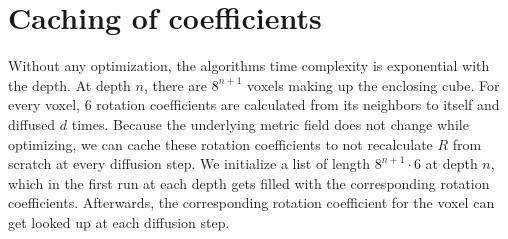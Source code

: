 \documentclass[../thesis.tex]{subfiles}
\begin{document}
\section{Caching of coefficients}
Without any optimization, the algorithms time complexity is exponential with the depth.
At depth $n$, there are $8^{n+1}$ voxels making up the enclosing cube.
For every voxel, 6 rotation coefficients are calculated from its neighbors to itself
and diffused $d$ times.
Because the underlying metric field does not change while optimizing,
we can cache these rotation coefficients to not recalculate $R$ from scratch at every diffusion step.
We initialize a list of length $8^{n+1}\cdot 6$ at depth $n$, which in the first run at each depth
gets filled with the corresponding rotation coefficients.
Afterwards, the corresponding rotation coefficient for the voxel can get
looked up at each diffusion step.
\end{document}
